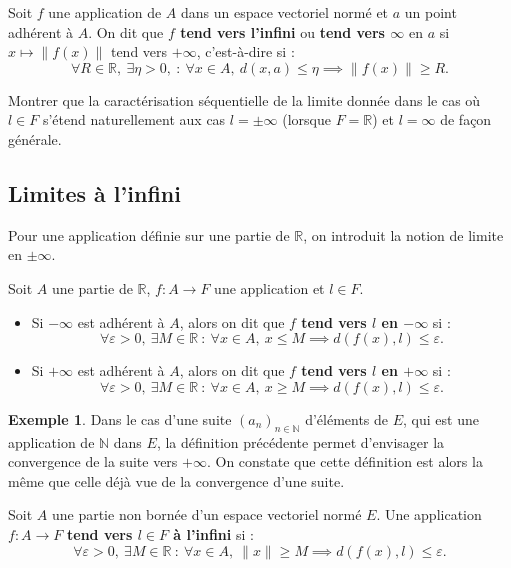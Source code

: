 \documentclass[french]{article}
\newcommand{\N}{\mathbb{N}}
\newcommand{\R}{\mathbb{R}}
\theoremstyle{plain}
\theoremstyle{definition}
\newtheorem*{ex}{Exemple}
\theoremstyle{remark}
\begin{document}
\begin{dfn}[HP]
	Soit $f$ une application de $A$ dans un espace vectoriel normé et $a$ un point adhérent à $A$. On dit que \textbf{$f$ tend vers l'infini} ou \textbf{tend vers $\infty$} en $a$ si $x\mapsto\lVert f(x)\rVert$ tend vers $+\infty$, c'est-à-dire si : $$\forall R\in\R,\ \exists\eta>0,\ :\ \forall x\in A,\ d(x,a)\leqslant\eta\implies \lVert f(x)\rVert\geqslant R.$$
\end{dfn}

\begin{exo}
	Montrer que la caractérisation séquentielle de la limite donnée dans le cas où $l\in F$ s'étend naturellement aux cas $l=\pm\infty$ (lorsque $F=\R$) et $l=\infty$ de façon générale.
\end{exo}

\subsection{Limites à l'infini}

Pour une application définie sur une partie de $\R$, on introduit la notion de limite en $\pm\infty$.

\begin{dfn}
	Soit $A$ une partie de $\R$, $f:A\to F$ une application et $l\in F$.
	\begin{itemize}
		\item Si $-\infty$ est adhérent à $A$, alors on dit que \textbf{$f$ tend vers $l$ en $-\infty$} si :
		$$\forall\varepsilon>0,\ \exists M\in\R\ : \ \forall x\in A,\ x\leqslant M\implies d(f(x),l)\leqslant\varepsilon.$$
		\item Si $+\infty$ est adhérent à $A$, alors on dit que \textbf{$f$ tend vers $l$ en $+\infty$} si :
		$$\forall\varepsilon>0,\ \exists M\in\R\ : \ \forall x\in A,\ x\geqslant M\implies d(f(x),l)\leqslant\varepsilon.$$
	\end{itemize}
\end{dfn}

\begin{ex}
	Dans le cas d'une suite $(a_n)_{n\in\N}$ d'éléments de $E$, qui est une application de $\N$ dans $E$, la définition précédente permet d'envisager la convergence de la suite vers $+\infty$. On constate que cette définition est alors la même que celle déjà vue de la convergence d'une suite.
\end{ex}

\begin{dfn}[HP]
	Soit $A$ une partie non bornée d'un espace vectoriel normé $E$. Une application $f:A\to F$ \textbf{tend vers $l\in F$ à l'infini} si : $$\forall\varepsilon>0,\ \exists M\in\R\ :\ \forall x\in A,\ \lVert x\rVert\geqslant M\implies d(f(x),l)\leqslant\varepsilon.$$
\end{dfn}
\end{document}
